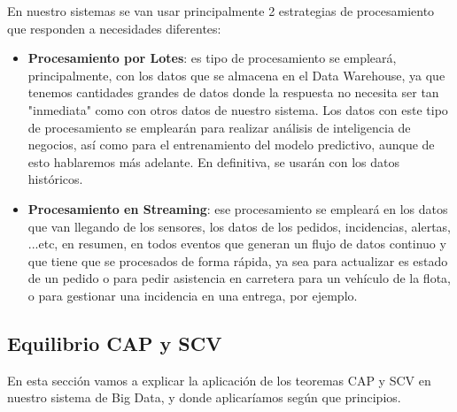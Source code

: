 En nuestro sistemas se van usar principalmente 2 estrategias de procesamiento que responden a necesidades diferentes:

\begin{itemize}
	\item \textbf{Procesamiento por Lotes}: es tipo de procesamiento se empleará, principalmente, con los datos que se almacena en el Data Warehouse, ya que tenemos cantidades grandes de datos donde la respuesta no necesita ser tan "inmediata" como  con otros datos de nuestro sistema. Los datos con este tipo de procesamiento se emplearán para realizar análisis de inteligencia de negocios, así como para el entrenamiento del modelo predictivo, aunque de esto hablaremos más adelante. En definitiva, se usarán con los datos históricos.
	
	\item \textbf{Procesamiento en Streaming}: ese procesamiento se empleará en los datos que van llegando de los sensores, los datos de los pedidos, incidencias, alertas, ...etc, en resumen, en todos eventos que generan un flujo de datos continuo y que tiene que se procesados de forma rápida, ya sea para actualizar es estado de un pedido o para pedir asistencia en carretera para un vehículo de la flota, o para gestionar una incidencia en una entrega, por ejemplo.
\end{itemize}

\subsection{Equilibrio CAP y SCV}
En esta sección vamos a explicar la aplicación de los teoremas CAP y SCV en nuestro sistema de Big Data, y donde aplicaríamos según que principios.

